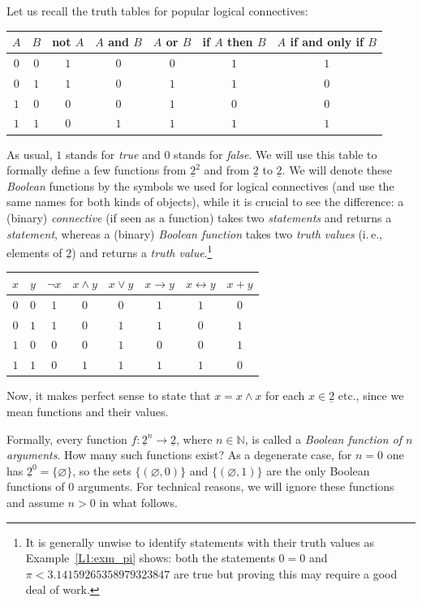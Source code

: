 \documentclass[12pt,notitlepage]{article}
\theoremstyle{plain}
\theoremstyle{definition}
\theoremstyle{plain}
\newcommand{\N}{\mathbb{N}}
\newcommand{\void}{\varnothing}
\newcommand{\ul}[1]{\underline{#1}}
\newcommand{\1}{\mathbf{1}}
\newcommand{\0}{\mathbf{0}}
\begin{document}
Let us recall the truth tables for popular logical connectives:
\begin{center}
	\begin{tabular}{| c c | c | c | c | c | c |}
		\hline
		$A$ & $B$ & not $A$  &$A$ and $B$&$A$ or $B$&if $A$ then $B$ &$A$ if and only if $B$\\
		\hline
		$0$&$0$&$1$&$0$&$0$&$1$&$1$\\
		$0$&$1$&$1$&$0$&$1$&$1$&$0$\\
		$1$&$0$&$0$&$0$&$1$&$0$&$0$\\
		$1$&$1$&$0$&$1$&$1$&$1$&$1$\\
		\hline
	\end{tabular}
\end{center}
As usual, $1$ stands for \emph{true} and $0$ stands for \emph{false}. We will use this table to formally define a few functions from $\ul{2}^2$ and from $\ul{2}$ to $\ul{2}$. We will denote these \emph{Boolean} functions by the symbols we used for logical connectives (and use the same names for both kinds of objects), while it is crucial to see the difference: a (binary) \emph{connective} (if seen as a function) takes two \emph{statements} and returns a \emph{statement}, whereas a (binary) \emph{Boolean function} takes two \emph{truth values} (i.\,e., elements of $\ul{2}$) and returns a \emph{truth value}.\footnote{It is generally unwise to identify statements with their truth values as Example~\ref{L1:exm_pi} shows: both the statements $0 = 0$ and $\pi < 3.14159265358979323847$ are true but proving this may require a good deal of work.} 
\begin{center}
	\begin{tabular}{| c c | c | c | c | c | c | c |}
		\hline
		$x$ & $y$ & $\neg x$  &$x \wedge y$&$x \vee y$&$x \to y$ &$x \leftrightarrow y$&$x + y$\\
		\hline
		$0$&$0$&$1$&$0$&$0$&$1$&$1$&$0$\\
		$0$&$1$&$1$&$0$&$1$&$1$&$0$&$1$\\
		$1$&$0$&$0$&$0$&$1$&$0$&$0$&$1$\\
		$1$&$1$&$0$&$1$&$1$&$1$&$1$&$0$\\
		\hline
	\end{tabular}
\end{center}
Now, it makes perfect sense to state that $x = x \wedge x$ for each $x \in \ul{2}$ etc., since we mean functions and their values.

Formally, every function $f\colon \ul{2}^n \to \ul{2}$, where $n \in \N$, is called a \emph{Boolean function of $n$ arguments}. How many such functions exist? As a degenerate case, for $n = 0$ one has $\ul{2}^0 = \{ \void \}$, so the sets $\{ (\void, 0) \}$ and $\{ (\void, 1) \}$ are the only Boolean functions of $0$ arguments. For technical reasons, we will ignore these functions and assume $n > 0$ in what follows.
\end{document}
